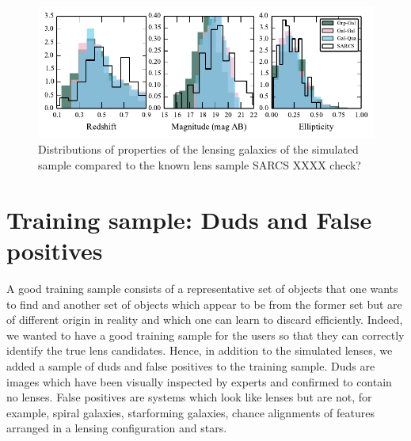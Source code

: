 \documentclass[useAMS,usenatbib,a4paper]{mn2e}
\begin{document}

\begin{figure}
\begin{center}
\includegraphics[scale=1.3]{sw-cfhtls-figs/lensprop.pdf}
\caption{ \label{fig:lensprop}
Distributions of properties of the lensing galaxies of the simulated
sample compared to the known lens sample SARCS XXXX check? 
}
\end{center}
\end{figure}


%



\section{Training sample: Duds and False positives}
\label{sec:dfp}

A good training sample consists of a representative set of objects that
one wants to find and another set of objects which appear to be from the
former set but are of different origin in reality and which one can
learn to discard efficiently. Indeed, we wanted to have a good training
sample for the \sw users so that they can correctly identify the true
lens candidates. Hence, in addition to the simulated lenses, we
added a sample of duds and false positives to the training sample. Duds
are images which have been visually inspected by experts and confirmed
to contain no lenses.  False positives are systems which look like
lenses but are not, for example, spiral galaxies, starforming galaxies,
chance alignments of features arranged in a lensing configuration and
stars. 
\end{document}
